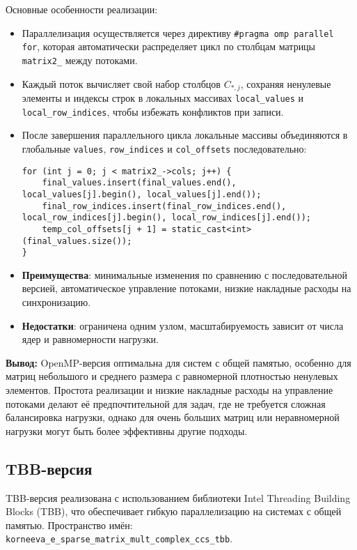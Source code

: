 \documentclass[12pt]{extarticle}
\begin{document}
Основные особенности реализации:
\begin{itemize}
    \item Параллелизация осуществляется через директиву \texttt{\#pragma omp parallel for}, которая автоматически распределяет цикл по столбцам матрицы \texttt{matrix2\_} между потоками.
    \item Каждый поток вычисляет свой набор столбцов $C_{*,j}$, сохраняя ненулевые элементы и индексы строк в локальных массивах \texttt{local\_values} и \texttt{local\_row\_indices}, чтобы избежать конфликтов при записи.
    \item После завершения параллельного цикла локальные массивы объединяются в глобальные \texttt{values}, \texttt{row\_indices} и \texttt{col\_offsets} последовательно:
    \begin{lstlisting}[caption={Объединение результатов в методе RunImpl},label={lst:openmp_merge}]
for (int j = 0; j < matrix2_->cols; j++) {
    final_values.insert(final_values.end(), local_values[j].begin(), local_values[j].end());
    final_row_indices.insert(final_row_indices.end(), local_row_indices[j].begin(), local_row_indices[j].end());
    temp_col_offsets[j + 1] = static_cast<int>(final_values.size());
}
    \end{lstlisting}
    \item \textbf{Преимущества}: минимальные изменения по сравнению с последовательной версией, автоматическое управление потоками, низкие накладные расходы на синхронизацию.
    \item \textbf{Недостатки}: ограничена одним узлом, масштабируемость зависит от числа ядер и равномерности нагрузки.
\end{itemize}

\textbf{Вывод:} OpenMP-версия оптимальна для систем с общей памятью, особенно для матриц небольшого и среднего размера с равномерной плотностью ненулевых элементов. Простота реализации и низкие накладные расходы на управление потоками делают её предпочтительной для задач, где не требуется сложная балансировка нагрузки, однако для очень больших матриц или неравномерной нагрузки могут быть более эффективны другие подходы.

\subsection{TBB-версия}

\hspace*{1.25cm}TBB-версия реализована с использованием библиотеки Intel Threading Building Blocks (TBB), что обеспечивает гибкую параллелизацию на системах с общей памятью. Пространство имён: \texttt{korneeva\_e\_sparse\_matrix\_mult\_complex\_ccs\_tbb}. \\[-0.2cm]
\end{document}
